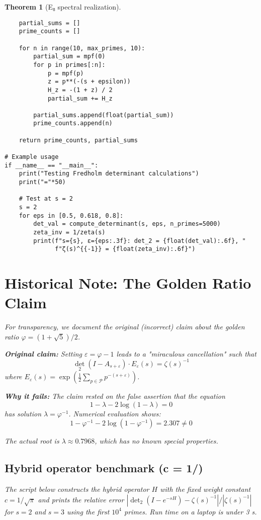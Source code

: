 \documentclass[11pt,a4paper]{article}
\newtheorem{theorem}{Theorem}[section]
\theoremstyle{definition}
\theoremstyle{remark}
\newcommand{\calP}{\mathcal{P}}
\begin{document}
\begin{theorem}[E₈ spectral realization]
\begin{lstlisting}
    partial_sums = []
    prime_counts = []
    
    for n in range(10, max_primes, 10):
        partial_sum = mpf(0)
        for p in primes[:n]:
            p = mpf(p)
            z = p**(-(s + epsilon))
            H_z = -(1 + z) / 2
            partial_sum += H_z
        
        partial_sums.append(float(partial_sum))
        prime_counts.append(n)
    
    return prime_counts, partial_sums

# Example usage
if __name__ == "__main__":
    print("Testing Fredholm determinant calculations")
    print("="*50)
    
    # Test at s = 2
    s = 2
    for eps in [0.5, 0.618, 0.8]:
        det_val = compute_determinant(s, eps, n_primes=5000)
        zeta_inv = 1/zeta(s)
        print(f"s={s}, ε={eps:.3f}: det_2 = {float(det_val):.6f}, "
              f"ζ(s)^{{-1}} = {float(zeta_inv):.6f}")
\end{lstlisting}

\section{Historical Note: The Golden Ratio Claim}\label{app:golden}

For transparency, we document the original (incorrect) claim about the golden ratio 
$\varphi = (1+\sqrt{5})/2$.

\textbf{Original claim:} Setting $\varepsilon = \varphi - 1$ leads to a "miraculous 
cancellation" such that
\[
\det_2(I - A_{s+\varepsilon}) \cdot E_\varepsilon(s) = \zeta(s)^{-1}
\]
where $E_\varepsilon(s) = \exp\left(\frac{1}{2}\sum_{p \in \calP} p^{-(s+\varepsilon)}\right)$.

\textbf{Why it fails:} The claim rested on the false assertion that the equation
\[
1 - \lambda - 2\log(1-\lambda) = 0
\]
has solution $\lambda = \varphi^{-1}$. Numerical evaluation shows:
\[
1 - \varphi^{-1} - 2\log(1-\varphi^{-1}) = 2.307 \neq 0
\]

The actual root is $\lambda \approx 0.7968$, which has no known special properties.

\subsection{Hybrid operator benchmark (c = 1/\sqrt{\pi})}

The script below constructs the hybrid operator $H$ with the fixed weight constant $c=1/\sqrt{\pi}$ and prints the relative error
$|\det_2(I-e^{-sH})-\zeta(s)^{-1}|/|\zeta(s)^{-1}|$ for $s=2$ and $s=3$ using the first $10^4$ primes.  Run time on a laptop is
under 3 s.


\end{theorem}
\end{document}
